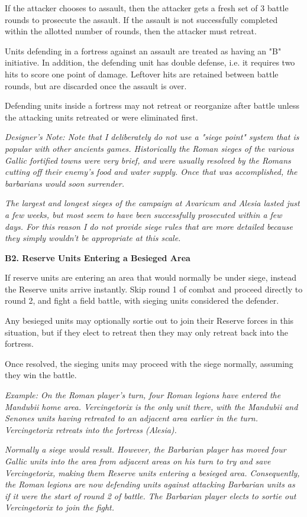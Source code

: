 If the attacker chooses to assault, then the attacker gets a fresh set of 3 battle rounds to prosecute the assault. If the assault is not successfully completed within the allotted number of rounds, then the attacker must retreat.

Units defending in a fortress against an assault are treated as having an "B" initiative. In addition, the defending unit has double defense, i.e. it requires two hits to score one point of damage. Leftover hits are retained between battle rounds, but are discarded once the assault is over.

Defending units inside a fortress may not retreat or reorganize after battle unless the attacking units retreated or were eliminated first.


\textit{Designer's Note: Note that I deliberately do not use a "siege point" system that is popular with other ancients games. Historically the Roman sieges of the various Gallic fortified towns were very brief, and were usually resolved by the Romans cutting off their enemy's food and water supply. Once that was accomplished, the barbarians would soon surrender.}

\textit{The largest and longest sieges of the campaign at Avaricum and Alesia lasted just a few weeks, but most seem to have been successfully prosecuted within a few days. For this reason I do not provide siege rules that are more detailed because they simply wouldn't be appropriate at this scale.}

\textbf{B2. Reserve Units Entering a Besieged Area}

If reserve units are entering an area that would normally be under siege, instead the Reserve units arrive instantly. Skip round 1 of combat and proceed directly to round 2, and fight a field battle, with sieging units considered the defender. 

Any besieged units may optionally sortie out to join their Reserve forces in this situation, but if they elect to retreat then they may only retreat back into the fortress.

Once resolved, the sieging units may proceed with the siege normally, assuming they win the battle.

\textit{Example: On the Roman player's turn, four Roman legions have entered the Mandubii home area. Vercingetorix is the only unit there, with the Mandubii and Senones units having retreated to an adjacent area earlier in the turn. Vercingetorix retreats into the fortress (Alesia).}

\textit{Normally a siege would result. However, the Barbarian player has moved four Gallic units into the area from adjacent areas on his turn to try and save Vercingetorix, making them Reserve units entering a besieged area. Consequently, the Roman legions are now defending units against attacking Barbarian units as if it were the start of round 2 of battle. The Barbarian player elects to sortie out Vercingetorix to join the fight.}

